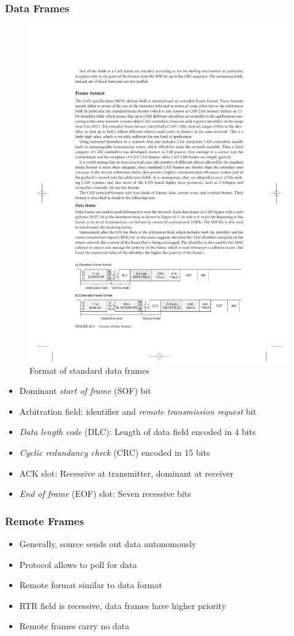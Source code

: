 \documentclass{beamer}
\begin{document}
\begin{frame}
	\frametitle{Data Frames}
	\begin{figure}
		\includegraphics[width=.6\textwidth]{dataframe.pdf} 
		\caption{Format of standard data frames \cite{principles}}
	\end{figure}
	\begin{itemize}
		\item Dominant \emph{start of frame} (SOF) bit
		\item Arbitration field: identifier and \emph{remote transmission request} bit
		\item \emph{Data length code} (DLC): Length of data field encoded in 4 bits
		\item \emph{Cyclic redundancy check} (CRC) encoded in 15 bits
		\item ACK slot: Recessive at transmitter, dominant at receiver
		\item \emph{End of frame} (EOF) slot: Seven recessive bits
	\end{itemize}
\end{frame}

\begin{frame}
	\frametitle{Remote Frames}
	\begin{itemize}
		\item Generally, source sends out data autonomously
		\item Protocol allows to poll for data
		\item Remote format similar to data format
		\item RTR field is recessive, data frames have higher priority
		\item Remote frames carry no data
	\end{itemize}
\end{frame}
\end{document}
